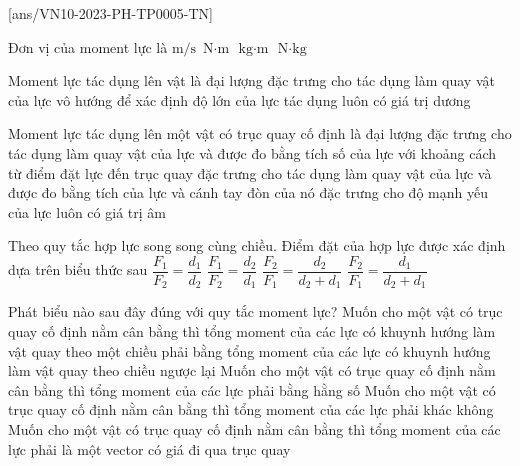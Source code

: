 \let\lesson\undefined
\newcommand{\lesson}{\phantomlesson{Ôn tập chương 5}}
\setcounter{ex}{0}
\setcounter{section}{2}
\setcounter{ex}{0}
[ans/VN10-2023-PH-TP0005-TN]
\begin{ex}
	Đơn vị của moment lực là
	\choice
	{$\si{\meter/\second}$}
	{\True $\si{\newton\cdot\meter}$}
	{$\si{\kilogram\cdot\meter}$}
	{$\si{\newton\cdot\kilogram}$}
	\loigiai{}
\end{ex}
\begin{ex}
	Moment lực tác dụng lên vật là đại lượng
	\choice
	{\True đặc trưng cho tác dụng làm quay vật của lực}
	{vô hướng}
	{để xác định độ lớn của lực tác dụng}
	{luôn có giá trị dương}
	\loigiai{}
\end{ex}
\begin{ex}
Moment lực tác dụng lên một vật có trục quay cố định là đại lượng	
	\choice
	{đặc trưng cho tác dụng làm quay vật của lực và được đo bằng tích số của lực với khoảng cách từ điểm đặt lực đến trục quay}
	{\True đặc trưng cho tác dụng làm quay vật của lực và được đo bằng tích của lực và cánh tay đòn của nó}
	{đặc trưng cho độ mạnh yếu của lực}
	{luôn có giá trị âm}
	\loigiai{}
\end{ex}
\begin{ex}
	Theo quy tắc hợp lực song song cùng chiều. Điểm đặt của hợp lực được xác định dựa trên biểu thức sau
	\choice
	{$\dfrac{F_1}{F_2}=\dfrac{d_1}{d_2}$}
	{\True $\dfrac{F_1}{F_2}=\dfrac{d_2}{d_1}$}
	{$\dfrac{F_2}{F_1}=\dfrac{d_2}{d_2+d_1}$}
	{$\dfrac{F_2}{F_1}=\dfrac{d_1}{d_2+d_1}$}
	\loigiai{}
\end{ex}
\begin{ex}
	Phát biểu nào sau đây đúng với quy tắc moment lực?
	\choice
	{\True Muốn cho một vật có trục quay cố định nằm cân bằng thì tổng moment của các lực có khuynh hướng làm vật quay theo một chiều phải bằng tổng moment của các lực có khuynh hướng làm vật quay theo chiều ngược lại}
	{Muốn cho một vật có trục quay cố định nằm cân bằng thì tổng moment của các lực phải bằng hằng số}
	{Muốn cho một vật có trục quay cố định nằm cân bằng thì tổng moment của các lực phải khác không}
	{Muốn cho một vật có trục quay cố định nằm cân bằng thì tổng moment của các lực phải là một vector có giá đi qua trục quay}
	\loigiai{}
\end{ex}
